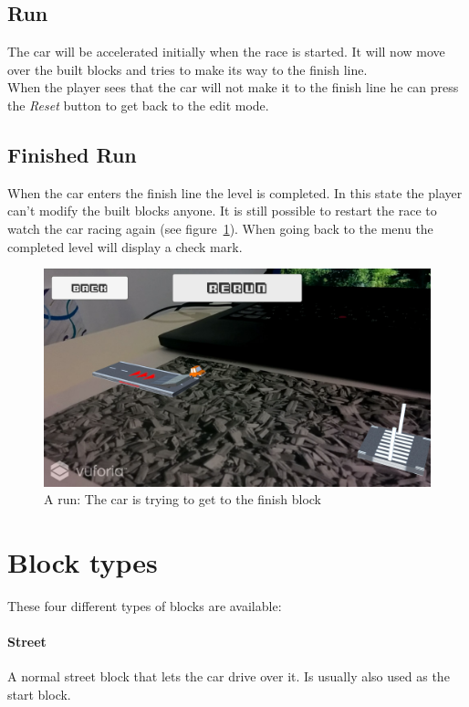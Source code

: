 \documentclass{vgtc}                          %
\begin{document}
\subsection{Run}
The car will be accelerated initially when the race is started. It will now move over the built blocks and tries to make its way to the finish line.\\
When the player sees that the car will not make it to the finish line he can press the \textit{Reset} button to get back to the edit mode.

\subsection{Finished Run}
When the car enters the finish line the level is completed. In this state the player can't modify the built blocks anyone. It is still possible to restart the race to watch the car racing again (see figure~\ref{fig:run}). When going back to the menu the completed level will display a check mark.

\begin{figure}[tb]
	\centering
	\includegraphics[width=\columnwidth]{run}
	\caption{A run: The car is trying to get to the finish block}
	\label{fig:run}
\end{figure}

\section{Block types}
These four different types of blocks are available:
\paragraph{Street}
A normal street block that lets the car drive over it. Is usually also used as the start block.
\end{document}
